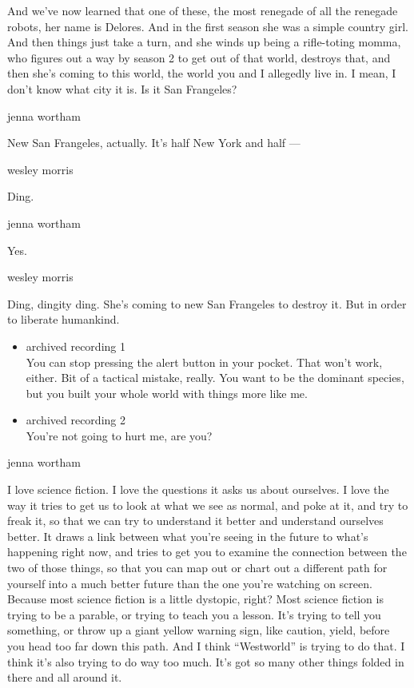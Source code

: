 And we've now learned that one of these, the most renegade of all the
renegade robots, her name is Delores. And in the first season she was a
simple country girl. And then things just take a turn, and she winds up
being a rifle-toting momma, who figures out a way by season 2 to get out
of that world, destroys that, and then she's coming to this world, the
world you and I allegedly live in. I mean, I don't know what city it is.
Is it San Frangeles?

jenna wortham

New San Frangeles, actually. It's half New York and half ---

wesley morris

Ding.

jenna wortham

Yes.

wesley morris

Ding, dingity ding. She's coming to new San Frangeles to destroy it. But
in order to liberate humankind.

\begin{itemize}
\item
  archived recording 1\\
  You can stop pressing the alert button in your pocket. That won't
  work, either. Bit of a tactical mistake, really. You want to be the
  dominant species, but you built your whole world with things more like
  me.
\item
  archived recording 2\\
  You're not going to hurt me, are you?
\end{itemize}

jenna wortham

I love science fiction. I love the questions it asks us about ourselves.
I love the way it tries to get us to look at what we see as normal, and
poke at it, and try to freak it, so that we can try to understand it
better and understand ourselves better. It draws a link between what
you're seeing in the future to what's happening right now, and tries to
get you to examine the connection between the two of those things, so
that you can map out or chart out a different path for yourself into a
much better future than the one you're watching on screen. Because most
science fiction is a little dystopic, right? Most science fiction is
trying to be a parable, or trying to teach you a lesson. It's trying to
tell you something, or throw up a giant yellow warning sign, like
caution, yield, before you head too far down this path. And I think
``Westworld'' is trying to do that. I think it's also trying to do way
too much. It's got so many other things folded in there and all around
it.

